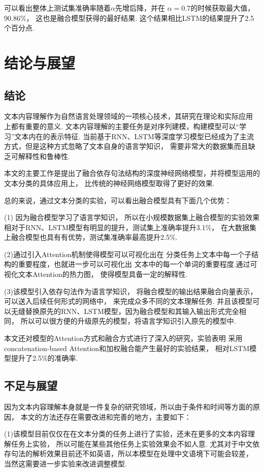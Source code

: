 \documentclass[bachelor,adobefonts]{jnuthesis}
\begin{document}
可以看出整体上测试集准确率随着$\alpha$先增后降，并在
$\alpha = 0.7$的时候获取最大值，90.86\%，
这也是融合模型获得的最好结果.
这个结果相比LSTM的结果提升了2.5个百分点.

\chapter{结论与展望}
\section{结论}
文本内容理解作为自然语言处理领域的一项核心技术，其研究在理论和实际应用
上都有重要的意义.
文本内容理解的主要任务是对序列建模，构建模型可以“学习”文本内在的表示特征.
当前基于RNN、LSTM等深度学习模型已经成为了主流方式，但是这种方式忽略了文本自身的语言学知识，
需要非常大的数据集而且缺乏可解释性和鲁棒性.

本文的主要工作是提出了融合依存句法结构的深度神经网络模型，并将模型运用的文本分类的具体应用上，
比传统的神经网络模型取得了更好的效果.

总的来说，通过文本分类的实验，可以看出融合模型具有下面几个优势：

(1) 因为融合模型学习了语言学知识，
所以在小规模数据集上融合模型的实验效果相对于RNN、LSTM模型有明显的提升，测试集上准确率提升3.1\%，
在大数据集上融合模型也具有有优势，测试集准确率最高提升2.5\%.

(2)通过引入Attention机制使得模型可以可视化出在
分类任务上文本中每一个子结构的重要程度，也就进一步可以可视化出
文本中的每一个单词的重要程度.通过可视化文本Attention的热力图，
使得模型具备一定的解释性.

(3)该模型引入依存句法作为语言学知识，
将融合模型的输出结果融合向量表示，可以送入后续任何形式的网络中，
来完成众多不同的文本理解任务.
并且该模型可以无缝替换原先的RNN、LSTM模型，因为融合模型和其输入输出形式完全相同，
所以可以很方便的升级原先的模型，将语言学知识引入原先的模型中.

本文还对模型的Attention方式和融合方式进行了深入的研究，实验表明
采用concatenation-based Attention和加权融合能产生最好的实验结果，
相对LSTM模型提升了2.5\%的准确率.

\section{不足与展望}
因为文本内容理解本身就是一件复杂的研究领域，所以由于条件和时间等方面的原因，
本文的方法还存在需要改进和完善的地方，主要如下：

(1)该模型目前仅仅在在文本分类的任务上进行了实验，还未在更多的文本内容理解任务上实验，
所以可能在某些其他任务上实验效果会不如人意.
尤其对于中文依存句法的解析效果目前还不如英语，所以本模型在处理中文语境下可能会较差，
当然这需要进一步实验来改进调整模型.
\end{document}
